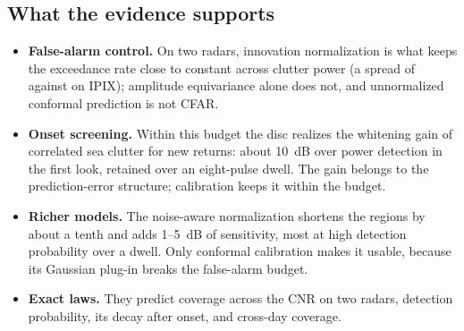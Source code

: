 \documentclass[journal]{IEEEtran}
\begin{document}
\subsection{What the evidence supports}
\begin{itemize}[leftmargin=*,itemsep=1pt]
\item \textbf{False-alarm control.} On two radars, innovation normalization is what keeps the exceedance rate close to constant across clutter power (a spread of \QPfaINSpread{} against \QPfaUSpread{} on IPIX); amplitude equivariance alone does not, and unnormalized conformal prediction is not CFAR.
\item \textbf{Onset screening.} Within this budget the disc realizes the whitening gain of correlated sea clutter for new returns: about 10~dB over power detection in the first look, retained over an eight-pulse dwell. The gain belongs to the prediction-error structure; calibration keeps it within the budget.
\item \textbf{Richer models.} The noise-aware normalization shortens the regions by about a tenth and adds 1--5~dB of sensitivity, most at high detection probability over a dwell. Only conformal calibration makes it usable, because its Gaussian plug-in breaks the false-alarm budget.
\item \textbf{Exact laws.} They predict coverage across the CNR on two radars, detection probability, its decay after onset, and cross-day coverage.
\end{itemize}
\end{document}
